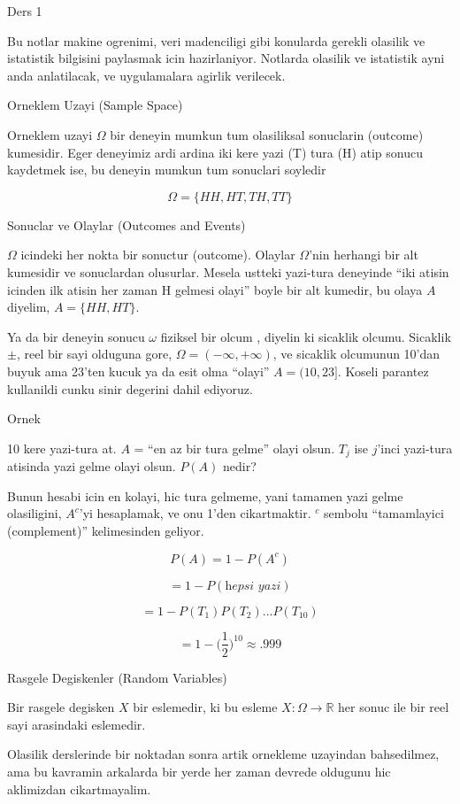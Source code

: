 \documentclass[12pt,fleqn]{article}
\begin{document}
Ders 1

Bu notlar makine ogrenimi, veri madenciligi gibi konularda gerekli olasilik
ve istatistik bilgisini paylasmak icin hazirlaniyor. Notlarda olasilik ve
istatistik ayni anda anlatilacak, ve uygulamalara agirlik verilecek. 

Orneklem Uzayi (Sample Space)

Orneklem uzayi $\Omega$ bir deneyin mumkun tum olasiliksal sonuclarin
(outcome) kumesidir. Eger deneyimiz ardi ardina iki kere yazi (T) tura (H)
atip sonucu kaydetmek ise, bu deneyin mumkun tum sonuclari soyledir

\[\Omega = \{HH,HT,TH,TT\} \]

Sonuclar ve Olaylar (Outcomes and Events)

$\Omega$ icindeki her nokta bir sonuctur (outcome). Olaylar $\Omega$'nin
herhangi bir alt kumesidir ve sonuclardan olusurlar. Mesela ustteki
yazi-tura deneyinde ``iki atisin icinden ilk atisin her zaman H gelmesi
olayi'' boyle bir alt kumedir, bu olaya $A$ diyelim, $A =
\{HH,HT\}$.

Ya da bir deneyin sonucu $\omega$ fiziksel bir olcum , diyelin ki sicaklik
olcumu. Sicaklik $\pm$, reel bir sayi olduguna gore, $\Omega = (-\infty,
+\infty)$, ve
sicaklik olcumunun 10'dan buyuk ama 23'ten kucuk ya da esit
olma ``olayi'' $A = (10,23]$. Koseli parantez kullanildi cunku sinir
degerini dahil ediyoruz. 

Ornek 

10 kere yazi-tura at. $A$ = ``en az bir tura gelme'' olayi olsun. $T_j$ ise
$j$'inci yazi-tura atisinda yazi gelme olayi olsun. $P(A)$ nedir? 

Bunun hesabi icin en kolayi, hic tura gelmeme, yani tamamen yazi gelme
olasiligini, $A^c$'yi hesaplamak, ve onu 1'den cikartmaktir. $^c$ sembolu
``tamamlayici (complement)'' kelimesinden geliyor.

\[ P(A) = 1 - P(A^c) \]

\[ = 1 - P(\textit{hepsi yazi}) \]

\[ = 1-P(T_1)P(T_2)...P(T_{10}) \]

\[ = 1 - \bigg(\frac{1}{2}\bigg)^{10} \approx .999 \]


Rasgele Degiskenler (Random Variables)

Bir rasgele degisken $X$ bir eslemedir, ki bu esleme $X: \Omega \to \mathbb{R}$
her sonuc ile bir reel sayi arasindaki eslemedir. 

Olasilik derslerinde bir noktadan sonra artik ornekleme uzayindan
bahsedilmez, ama bu kavramin arkalarda bir yerde her zaman devrede oldugunu
hic aklimizdan cikartmayalim. 
\end{document}
